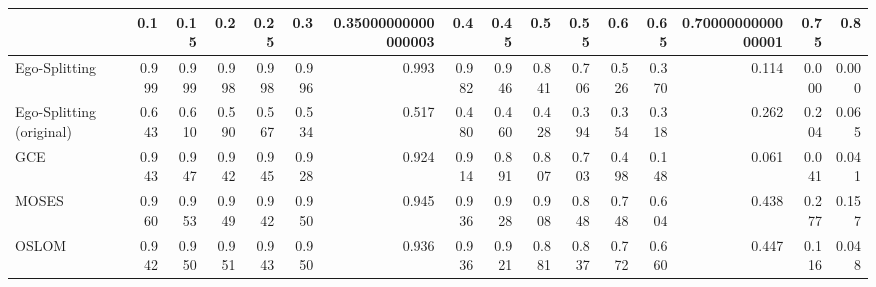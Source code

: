 \begin{tabular}{lrrrrrrrrrrrrrrr}
\toprule
{} &   0.1 &  0.15 &   0.2 &  0.25 &   0.3 & 0.35000000000000003 &   0.4 &  0.45 &   0.5 &  0.55 &   0.6 &  0.65 & 0.7000000000000001 &  0.75 &   0.8 \\
\midrule
Ego-Splitting            & 0.999 & 0.999 & 0.998 & 0.998 & 0.996 &               0.993 & 0.982 & 0.946 & 0.841 & 0.706 & 0.526 & 0.370 &              0.114 & 0.000 & 0.000 \\
Ego-Splitting (original) & 0.643 & 0.610 & 0.590 & 0.567 & 0.534 &               0.517 & 0.480 & 0.460 & 0.428 & 0.394 & 0.354 & 0.318 &              0.262 & 0.204 & 0.065 \\
GCE                      & 0.943 & 0.947 & 0.942 & 0.945 & 0.928 &               0.924 & 0.914 & 0.891 & 0.807 & 0.703 & 0.498 & 0.148 &              0.061 & 0.041 & 0.041 \\
MOSES                    & 0.960 & 0.953 & 0.949 & 0.942 & 0.950 &               0.945 & 0.936 & 0.928 & 0.908 & 0.848 & 0.748 & 0.604 &              0.438 & 0.277 & 0.157 \\
OSLOM                    & 0.942 & 0.950 & 0.951 & 0.943 & 0.950 &               0.936 & 0.936 & 0.921 & 0.881 & 0.837 & 0.772 & 0.660 &              0.447 & 0.116 & 0.048 \\
\bottomrule
\end{tabular}
